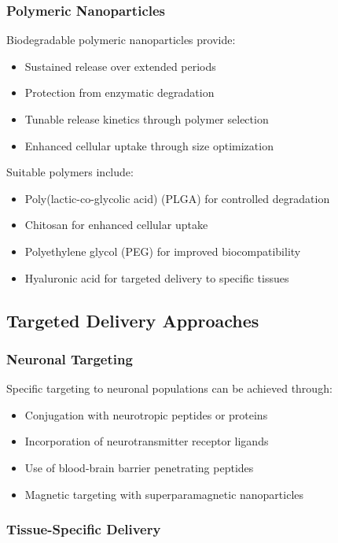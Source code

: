 \documentclass[11pt,a4paper]{article}
\begin{document}
\subsubsection{Polymeric Nanoparticles}

Biodegradable polymeric nanoparticles provide:
\begin{itemize}
\item Sustained release over extended periods
\item Protection from enzymatic degradation
\item Tunable release kinetics through polymer selection
\item Enhanced cellular uptake through size optimization
\end{itemize}

Suitable polymers include:
\begin{itemize}
\item Poly(lactic-co-glycolic acid) (PLGA) for controlled degradation
\item Chitosan for enhanced cellular uptake
\item Polyethylene glycol (PEG) for improved biocompatibility
\item Hyaluronic acid for targeted delivery to specific tissues
\end{itemize}

\subsection{Targeted Delivery Approaches}

\subsubsection{Neuronal Targeting}

Specific targeting to neuronal populations can be achieved through:
\begin{itemize}
\item Conjugation with neurotropic peptides or proteins
\item Incorporation of neurotransmitter receptor ligands
\item Use of blood-brain barrier penetrating peptides
\item Magnetic targeting with superparamagnetic nanoparticles
\end{itemize}

\subsubsection{Tissue-Specific Delivery}
\end{document}
